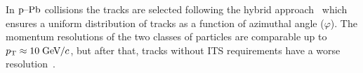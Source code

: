 In $\mbox{p--Pb}$ collisions the tracks are selected following the hybrid approach~\cite{hybridExplanation} which ensures a uniform distribution of tracks as a function of azimuthal angle ($\varphi$). The momentum resolutions of the two classes of particles are comparable up to $p_{\rm T} \approx 10\;\mathrm{GeV}\kern-0.05em/\kern-0.02em c$, but after that, tracks without ITS requirements have a worse resolution~\cite{alicePerformance,aliceBackgroundFluctuation}.



